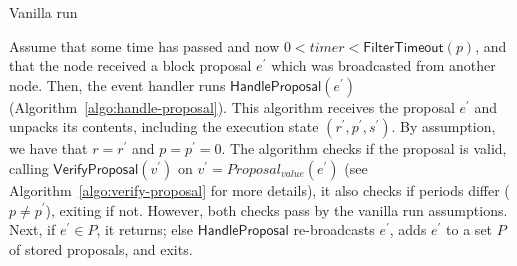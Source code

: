 \documentclass[10pt,a4paper]{article}
\begin{document}
\begin{section}{Vanilla run}
    
    
    
    Assume that some time has passed and now $0<timer<\mathsf{FilterTimeout}(p)$, and that 
    the node received a block proposal $e^\prime$ which was broadcasted from another node. 
    Then, the event handler runs $\mathsf{HandleProposal}(e^\prime)$ (Algorithm~\ref{algo:handle-proposal}).
    This algorithm receives the proposal $e^\prime$ and unpacks its contents,
    including the execution state $(r^\prime,p^\prime,s^\prime)$.
    By assumption, we have that $r=r^\prime$ and $p=p^\prime=0$.
    The algorithm checks if the proposal is valid, calling $\mathsf{VerifyProposal}(v^\prime)$ 
    on $v^\prime=Proposal_{value}(e^\prime)$ (see Algorithm~\ref{algo:verify-proposal} for more details),
    it also checks if periods differ ($p\neq p^\prime$), exiting if not. However, both checks pass by 
    the vanilla run assumptions.
    Next, if $e^\prime\in P$, it returns; else $\mathsf{HandleProposal}$ re-broadcasts $e^\prime$, 
    adds $e^\prime$ to a set $P$ of stored proposals, and exits.
    
    

\end{section}
\end{document}
